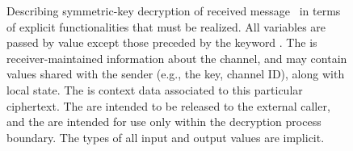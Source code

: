 \begin{figure}
\begin{center}
\end{center}
%
%
%
\caption{Describing symmetric-key decryption of received message~ in terms of
  explicit functionalities that must be realized. All variables are
  passed by value except those preceded by the keyword
  . The 
  is receiver-maintained information about the channel, and may contain values
  shared with the sender (e.g., the key, channel ID), along with local state.
  The  is context data associated to this particular
  ciphertext. The  are intended to be released to the
  external caller, and the  are intended for use only
within the decryption process boundary.  The types of all input and output
values are implicit.}
\label{fig:syntax-api-example}
\end{figure}


